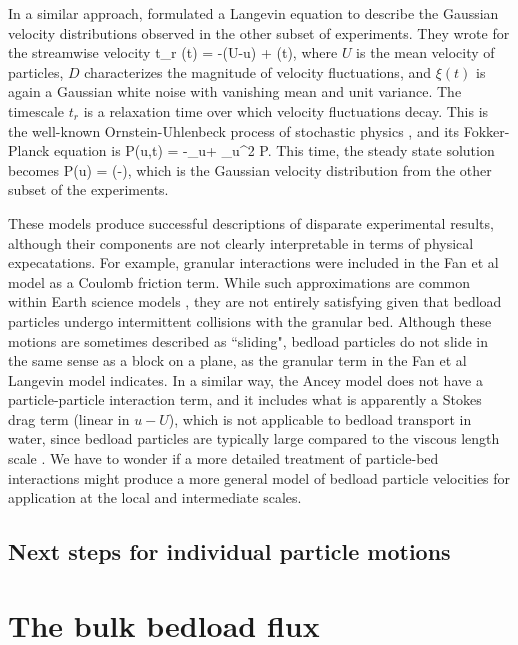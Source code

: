 In a similar approach, \citet{Ancey2014} formulated a Langevin equation to describe the Gaussian velocity distributions observed in the other subset of experiments. They wrote for the streamwise velocity 
\be t_r (t) = -(U-u) + \xi(t),\ee
where $U$ is the mean velocity of particles, $D$ characterizes the magnitude of velocity fluctuations, and $\xi(t)$ is again a Gaussian white noise with vanishing mean and unit variance. The timescale $t_r$ is a relaxation time over which velocity fluctuations decay. This is the well-known Ornstein-Uhlenbeck process of stochastic physics \citep{Gardiner1983}, and its Fokker-Planck equation is
\be \pt P(u,t) = -\partial_u +  \partial_u^2 P.\ee
This time, the steady state solution becomes
\be P(u) =  \exp\Big(-\Big), \ee
which is the Gaussian velocity distribution from the other subset of the experiments.

These models produce successful descriptions of disparate experimental results, although their components are not clearly interpretable in terms of physical expecatations. For example, granular interactions were included in the Fan et al model as a Coulomb friction term. While such approximations are common within Earth science models \citep{Kirkby1971}, they are not entirely satisfying given that bedload particles undergo intermittent collisions with the granular bed. Although these motions are sometimes described as ``sliding", bedload particles do not slide in the same sense as a block on a plane, as the granular term in the Fan et al Langevin model indicates.
In a similar way, the Ancey model does not have a particle-particle interaction term, and it includes what is apparently a Stokes drag term (linear in $u-U$), which is not applicable to bedload transport in water, since bedload particles are typically large compared to the viscous length scale \citep{Clift1978}.
We have to wonder if a more detailed treatment of particle-bed interactions might produce a more general model of bedload particle velocities for application at the local and intermediate scales.

\subsection{Next steps for individual particle motions}


\section{The bulk bedload flux}



